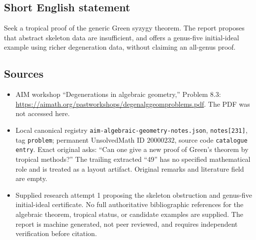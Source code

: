 \documentclass[11pt]{article}
\begin{document}
\subsection{Short English statement}
Seek a tropical proof of the generic Green syzygy theorem. The report proposes that abstract skeleton data are insufficient, and offers a genus-five initial-ideal example using richer degeneration data, without claiming an all-genus proof.
\subsection{Sources}
\begin{itemize}
\item AIM workshop ``Degenerations in algebraic geometry,'' Problem 8.3: \url{https://aimath.org/pastworkshops/degenalggeomproblems.pdf}. The PDF was not accessed here.
\item Local canonical registry \texttt{aim-algebraic-geometry-notes.json}, \texttt{notes[231]}, tag \texttt{problem}; permanent UnsolvedMath ID \(20000232\), source code \texttt{catalogue entry}. Exact original asks: ``Can one give a new proof of Green's theorem by tropical methods?'' The trailing extracted ``49'' has no specified mathematical role and is treated as a layout artifact. Original remarks and literature field are empty.
\item Supplied research attempt 1 proposing the skeleton obstruction and genus-five initial-ideal certificate. No full authoritative bibliographic references for the algebraic theorem, tropical status, or candidate examples are supplied. The report is machine generated, not peer reviewed, and requires independent verification before citation.
\end{itemize}
\end{document}
